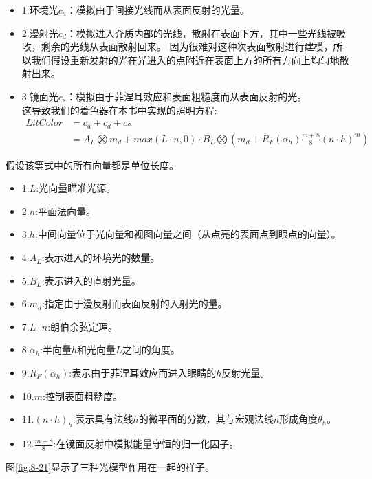 \begin{itemize}
  \item 1.环境光$c_{a}$：模拟由于间接光线而从表面反射的光量。
  \item 2.漫射光$c_{d}$：模拟进入介质内部的光线，散射在表面下方，其中一些光线被吸收，剩余的光线从表面散射回来。 因为很难对这种次表面散射进行建模，所以我们假设重新发射的光在光进入的点附近在表面上方的所有方向上均匀地散射出来。
  \item 3.镜面光$c_{s}$：模拟由于菲涅耳效应和表面粗糙度而从表面反射的光。\\
  这导致我们的着色器在本书中实现的照明方程:\\
  \begin{align*}\tag{eq.8.4}\label{eq.8.4}
  LitColor&=c_{a}+c_{d}+c{s}\\
  &=A_{L}\bigotimes m_{d}+max(L\cdot n, 0)\cdot B_{L}\bigotimes (m_{d}+R_{F}(\alpha_{h})\frac{m+8}{8}(n\cdot h)^{m})
  \end{align*}
\end{itemize}

\begin{flushleft}
假设该等式中的所有向量都是单位长度。\\
\end{flushleft}

\begin{itemize}
  \item 1.$L$:光向量瞄准光源。
  \item 2.$n$:平面法向量。
  \item 3.$h$:中间向量位于光向量和视图向量之间（从点亮的表面点到眼点的向量）。
  \item 4.$A_{L}$:表示进入的环境光的数量。
  \item 5.$B_{L}$:表示进入的直射光量。
  \item 6.$m_{d}$:指定由于漫反射而表面反射的入射光的量。
  \item 7.$L\cdot n$:朗伯余弦定理。
  \item 8.$\alpha_{h}$:半向量$h$和光向量$L$之间的角度。
  \item 9.$R_{F}(\alpha_{h})$:表示由于菲涅耳效应而进入眼睛的$h$反射光量。
  \item 10.$m$:控制表面粗糙度。
  \item 11.$(n\cdot h)_{h}$:表示具有法线$h$的微平面的分数，其与宏观法线$n$形成角度$θ_{h}$。
  \item 12.$\frac{m+8}{8}$:在镜面反射中模拟能量守恒的归一化因子。
\end{itemize}

\begin{flushleft}
图\ref{fig:8-21}显示了三种光模型作用在一起的样子。\\
\end{flushleft}


